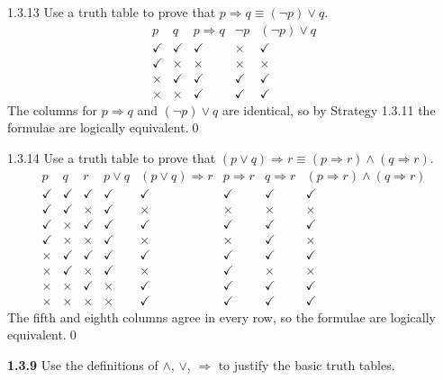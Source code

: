 \begin{bookex}[essential]{1.3.13}
Use a truth table to prove that $p\Rightarrow q\equiv(\neg p)\vee q$.
\solution
\[
\begin{array}{cc|c|cc}
p&q&p\Rightarrow q&\neg p&(\neg p)\vee q\\\hline
\checkmark&\checkmark&\checkmark&\times&\checkmark\\
\checkmark&\times&\times&\times&\times\\
\times&\checkmark&\checkmark&\checkmark&\checkmark\\
\times&\times&\checkmark&\checkmark&\checkmark
\end{array}
\]
The columns for $p\Rightarrow q$ and $(\neg p)\vee q$ are identical, so by Strategy 1.3.11 the formulae are logically equivalent.\qed
\end{bookex}

\begin{bookex}[essential]{1.3.14}
Use a truth table to prove that $(p\vee q)\Rightarrow r\equiv(p\Rightarrow r)\wedge(q\Rightarrow r)$.
\solution
\[
\begin{array}{ccc|cc|ccc}
p&q&r&p\vee q&(p\vee q)\Rightarrow r&p\Rightarrow r&q\Rightarrow r&(p\Rightarrow r)\wedge(q\Rightarrow r)\\\hline
\checkmark&\checkmark&\checkmark&\checkmark&\checkmark&\checkmark&\checkmark&\checkmark\\
\checkmark&\checkmark&\times&\checkmark&\times&\times&\times&\times\\
\checkmark&\times&\checkmark&\checkmark&\checkmark&\checkmark&\checkmark&\checkmark\\
\checkmark&\times&\times&\checkmark&\times&\times&\checkmark&\times\\
\times&\checkmark&\checkmark&\checkmark&\checkmark&\checkmark&\checkmark&\checkmark\\
\times&\checkmark&\times&\checkmark&\times&\checkmark&\times&\times\\
\times&\times&\checkmark&\times&\checkmark&\checkmark&\checkmark&\checkmark\\
\times&\times&\times&\times&\checkmark&\checkmark&\checkmark&\checkmark
\end{array}
\]
The fifth and eighth columns agree in every row, so the formulae are logically equivalent.\qed
\end{bookex}

\begin{trybox}[{1.3.9 \fO}]
\textbf{1.3.9} Use the definitions of $\wedge$, $\vee$, $\Rightarrow$ to justify the basic truth tables.
\end{trybox}

